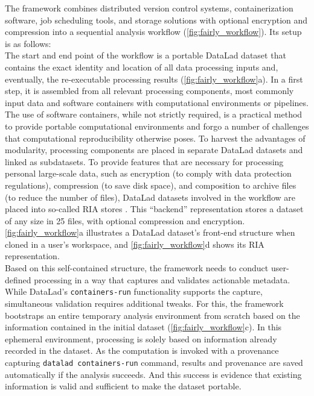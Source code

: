 The framework combines distributed version control systems, containerization software, job scheduling tools, and storage solutions with optional encryption and compression into a sequential analysis workflow (\cref{fig:fairly_workflow}).
Its setup is as follows:\\
The start and end point of the workflow is a portable DataLad dataset that contains the exact identity and location of all data processing inputs and, eventually, the re-executable processing results (\cref{fig:fairly_workflow}a).
In a first step, it is assembled from all relevant processing components, most commonly input data and software containers with computational environments or pipelines.
The use of software containers, while not strictly required, is a practical method to provide portable computational environments and forgo a number of challenges that computational reproducibility otherwise poses.
To harvest the advantages of modularity, processing components are placed in separate DataLad datasets and linked as subdatasets.
To provide features that are necessary for processing personal large-scale data, such as encryption (to comply with data protection regulations), compression (to save disk space), and composition to archive files (to reduce the number of files),
DataLad datasets involved in the workflow are placed into so-called RIA stores \citep{poldrackRIA}.
This ``backend'' representation stores a dataset of any size in 25 files, with optional compression and encryption.
\cref{fig:fairly_workflow}a illustrates a DataLad dataset's front-end structure when cloned in a user's workspace, and \cref{fig:fairly_workflow}d shows its RIA representation.\\
Based on this self-contained structure, the framework needs to conduct user-defined processing in a way that captures and validates actionable metadata.
While DataLad's \texttt{containers-run} functionality supports the capture, simultaneous validation requires additional tweaks.
For this, the framework bootstraps an entire temporary analysis environment from scratch based on the information contained in the initial dataset (\cref{fig:fairly_workflow}c).
In this ephemeral environment, processing is solely based on information already recorded in the dataset.
As the computation is invoked with a provenance capturing \texttt{datalad containers-run} command, results and provenance are saved automatically if the analysis succeeds.
And this success is evidence that existing information is valid and sufficient to make the dataset portable.\\
